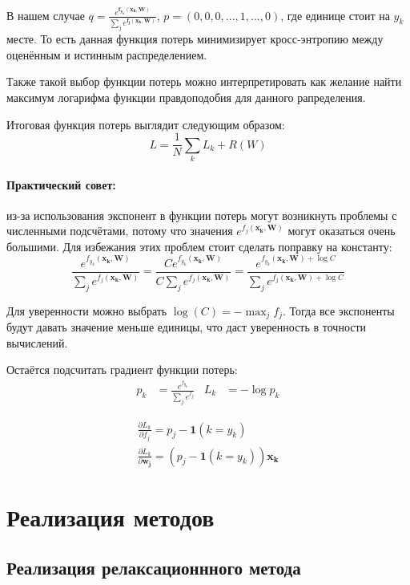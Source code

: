 \documentclass[a4paper]{article}
\newcommand{\xk}{\bm{x_k}}
\newcommand{\W}{\bm{W}}
\begin{document}
В нашем случае $q = \frac{e^{\bm{f_{y_k}(\xk, \W)}}}{\sum_je^{\bm{f_j(\xk, \W)}}}$, $p = (0,0,0,..., 1, ..., 0)$, где единице стоит на $y_k$ месте. То есть данная функция потерь минимизирует кросс-энтропию между оценённым и истинным распределением.

Также такой выбор функции потерь можно интерпретировать как желание найти максимум логарифма функции правдоподобия для данного рапределения.

Итоговая функция потерь выглядит следующим образом:
\begin{equation}
L = \frac{1}{N}\sum_k L_k + R(W)
\end{equation}

\paragraph*{Практический совет:} из-за использования экспонент в функции потерь могут возникнуть проблемы с численными подсчётами, потому что значения $e^{f_j(\xk, \W)}$ могут оказаться очень большими. Для избежания этих проблем стоит сделать поправку на константу:
\begin{equation}
\frac{e^{f_{y_k}(\xk, \W)}}{\sum_je^{f_j(\xk, \W)}} = \frac{Ce^{f_{y_k}(\xk, \W)}}{C\sum_je^{f_j(\xk, \W)}} = \frac{e^{f_{y_k}(\xk, \W) + \log C}}{\sum_je^{f_j(\xk, \W) + \log C}}
\end{equation}

Для уверенности можно выбрать $\log(C) = - \max_jf_j$. Тогда все экспоненты будут давать значение меньше единицы, что даст уверенность в точности вычислений.

Остаётся подсчитать градиент функции потерь:
\begin{align*}
p_k &= \frac{e^{f_{y_k}}}{\sum_je^{f_j}}     &       L_k &= -\log p_k
\end{align*}

\begin{eqnarray}
\frac{\partial L_k}{\partial f_j} = p_j - \bm{1}(k = y_k) \\
\frac{\partial L_k}{\partial \bm{w_j}} = \left(p_j - \bm{1}(k = y_k)\right) \xk
\end{eqnarray}

\section{Реализация методов}

\subsection{Реализация релаксационнного метода}
\end{document}
